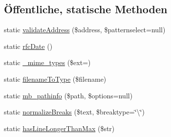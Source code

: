 \subsection*{Öffentliche, statische Methoden}
\begin{DoxyCompactItemize}
\item 
static \mbox{\hyperlink{class_p_h_p_mailer_ab8ded1ff8bd8d47c4a3300851cba88b4}{validate\+Address}} (\$address, \$patternselect=null)
\item 
static \mbox{\hyperlink{class_p_h_p_mailer_a0617b2311d5a7c5ca3308f839434c95a}{rfc\+Date}} ()
\item 
static \mbox{\hyperlink{class_p_h_p_mailer_ac31fdaba7cf01c43f9719cf63e8a5ef6}{\+\_\+mime\+\_\+types}} (\$ext=\textquotesingle{}\textquotesingle{})
\item 
static \mbox{\hyperlink{class_p_h_p_mailer_add54abd3420cd88712530270ca0c641d}{filename\+To\+Type}} (\$filename)
\item 
static \mbox{\hyperlink{class_p_h_p_mailer_a73136e7211d02834ea0fa6aaa7fa5db5}{mb\+\_\+pathinfo}} (\$path, \$options=null)
\item 
static \mbox{\hyperlink{class_p_h_p_mailer_ab552d3b3344802de40d2b67facd2629f}{normalize\+Breaks}} (\$text, \$breaktype=\char`\"{}\textbackslash{}\char`\"{})
\item 
static \mbox{\hyperlink{class_p_h_p_mailer_affe5b2756b810d299d33643b7e731409}{has\+Line\+Longer\+Than\+Max}} (\$str)
\end{DoxyCompactItemize}
